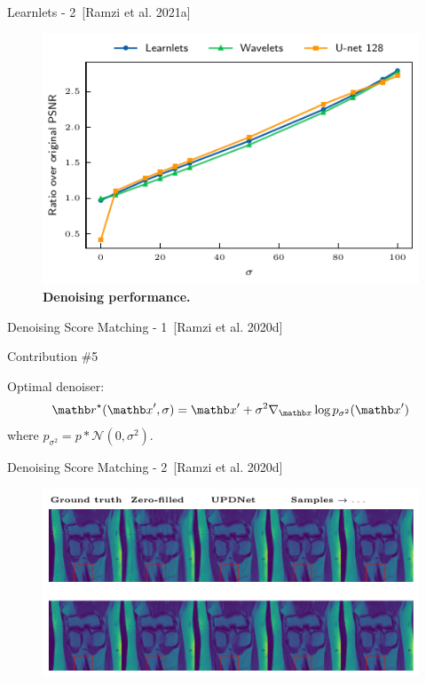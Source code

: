 \begin{frame}{Learnlets - 2~[Ramzi et al. 2021a]}
    \begin{figure}[ht]
        \includegraphics[height=0.78\textheight]{Figures/clinic_applic/model_comparison.pdf}
        \caption{\textbf{Denoising performance.}}
        \end{figure}
\end{frame}

\begin{frame}{Denoising Score Matching - 1~[Ramzi et al. 2020d]}
    \begin{exampleblock}{Contribution \#5}
    \end{exampleblock}
    Optimal denoiser:
    \begin{equation*}
        \rb^\star(\xb', \sigma) = \xb' + \sigma^2 \nabla_{\xb} \log p_{\sigma^2}(\xb')
    \end{equation*}
    where $p_{\sigma^2} = p \ast \mathcal{N}(0, \sigma^2)$.
\end{frame}

\begin{frame}{Denoising Score Matching - 2~[Ramzi et al. 2020d]}
    \begin{figure}
        \centering
        \includegraphics[width=\textwidth]{Figures/clinic_applic/dsm_main.pdf}
    \end{figure}

\end{frame}
